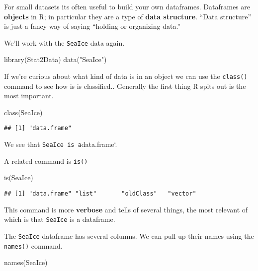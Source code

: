 \documentclass[
]{book}
\newenvironment{Shaded}{\begin{snugshade}}{\end{snugshade}}
\newcommand{\FunctionTok}[1]{\textcolor[rgb]{0.00,0.00,0.00}{#1}}
\newcommand{\NormalTok}[1]{#1}
\newcommand{\StringTok}[1]{\textcolor[rgb]{0.31,0.60,0.02}{#1}}
\begin{document}
For small datasets its often useful to build your own dataframes. Dataframes are \textbf{objects} in R; in particular they are a type of \textbf{data structure}. ``Data structure'' is just a fancy way of saying ``holding or organizing data.''

We'll work with the \texttt{SeaIce} data again.

\begin{Shaded}
\begin{Highlighting}[]
\FunctionTok{library}\NormalTok{(Stat2Data)}
\FunctionTok{data}\NormalTok{(}\StringTok{"SeaIce"}\NormalTok{)}
\end{Highlighting}
\end{Shaded}

If we're curious about what kind of data is in an object we can use the \texttt{class()} command to see how is is classified.. Generally the first thing R spits out is the most important.

\begin{Shaded}
\begin{Highlighting}[]
\FunctionTok{class}\NormalTok{(SeaIce)}
\end{Highlighting}
\end{Shaded}

\begin{verbatim}
## [1] "data.frame"
\end{verbatim}

We see that \texttt{SeaIce\ is\ a}data.frame`.

A related command is \texttt{is()}

\begin{Shaded}
\begin{Highlighting}[]
\FunctionTok{is}\NormalTok{(SeaIce)}
\end{Highlighting}
\end{Shaded}

\begin{verbatim}
## [1] "data.frame" "list"       "oldClass"   "vector"
\end{verbatim}

This command is more \textbf{verbose} and tells of several things, the most relevant of which is that \texttt{SeaIce} is a dataframe.

The \texttt{SeaIce} dataframe has several columns. We can pull up their names using the \texttt{names()} command.

\begin{Shaded}
\begin{Highlighting}[]
\FunctionTok{names}\NormalTok{(SeaIce)}
\end{Highlighting}
\end{Shaded}
\end{document}
